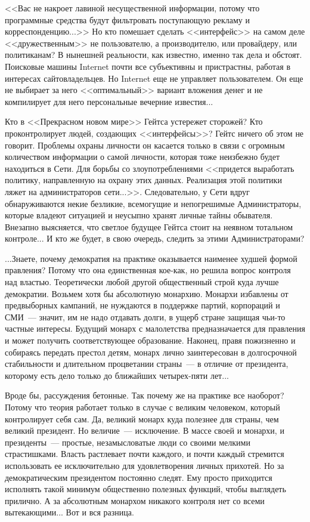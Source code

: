 \documentclass{scrbook}
\newcommand{\flqq}{<<}
\newcommand{\frqq}{>>}
\newcommand{\mdash}{~--- }
\begin{document}
{\flqq}Вас не накроет лавиной несущественной информации, потому что программные средства будут фильтровать поступающую рекламу и корреспонденцию...{\frqq} Но кто помешает сделать {\flqq}интерфейс{\frqq} на самом деле {\flqq}дружественным{\frqq} не пользователю, а производителю, или провайдеру, или политиканам? В нынешней реальности, как известно, именно так дела и обстоят. Поисковые машины Internet почти все субъективны и пристрастны, работая в интересах сайтовладельцев. Но Internet еще не управляет пользователем. Он еще не выбирает за него {\flqq}оптимальный{\frqq} вариант вложения денег и не компилирует для него персональные вечерние известия...

Кто в {\flqq}Прекрасном новом мире{\frqq} Гейтса устережет сторожей? Кто проконтролирует людей, создающих {\flqq}интерфейсы{\frqq}? Гейтс ничего об этом не говорит. Проблемы охраны личности он касается только в связи с огромным количеством информации о самой личности, которая тоже неизбежно будет находиться в Сети. Для борьбы со злоупотреблениями {\flqq}придется выработать политику, направленную на охрану этих данных. Реализация этой политики ляжет на администраторов сети...{\frqq}. Следовательно, у Сети вдруг обнаруживаются некие безликие, всемогущие и непогрешимые Администраторы, которые владеют ситуацией и неусыпно хранят личные тайны обывателя. Внезапно выясняется, что светлое будущее Гейтса стоит на неявном тотальном контроле... И кто же будет, в свою очередь, следить за этими Администраторами?

...Знаете, почему демократия на практике оказывается наименее худшей формой правления? Потому что она единственная кое-как, но решила вопрос контроля над властью. Теоретически любой другой общественный строй куда лучше демократии. Возьмем хотя бы абсолютную монархию. Монархи избавлены от предвыборных кампаний, не нуждаются в поддержке партий, корпораций и СМИ{\mdash}значит, им не надо отдавать долги, в ущерб стране защищая чьи-то частные интересы. Будущий монарх с малолетства предназначается для правления и может получить соответствующее образование. Наконец, правя пожизненно и собираясь передать престол детям, монарх лично заинтересован в долгосрочной стабильности и длительном процветании страны{\mdash}в отличие от президента, которому есть дело только до ближайших четырех-пяти лет...

Вроде бы, рассуждения бетонные. Так почему же на практике все наоборот? Потому что теория работает только в случае с великим человеком, который контролирует себя сам. Да, великий монарх куда полезнее для страны, чем великий президент. Но величие{\mdash}исключение. В массе своей и монархи, и президенты{\mdash}простые, незамысловатые люди со своими мелкими страстишками. Власть растлевает почти каждого, и почти каждый стремится использовать ее исключительно для удовлетворения личных прихотей. Но за демократическим президентом постоянно следят. Ему просто приходится исполнять такой минимум общественно полезных функций, чтобы выглядеть прилично. А за абсолютным монархом никакого контроля нет со всеми вытекающими... Вот и вся разница.
\end{document}
